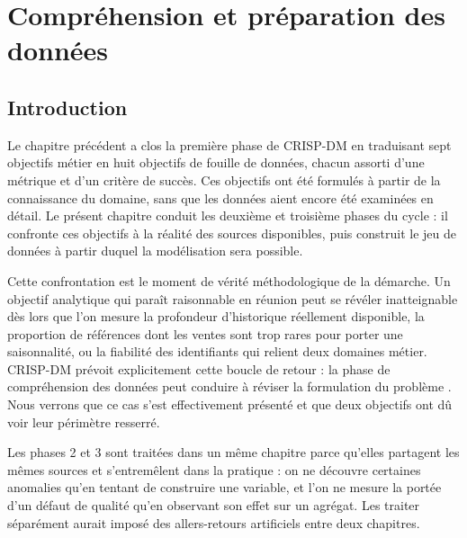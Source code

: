 %

\chapter{Compréhension et préparation des données}
\label{chap:donnees}

\section*{Introduction}

Le chapitre précédent a clos la première phase de CRISP-DM en traduisant sept objectifs métier en huit objectifs de fouille de données, chacun assorti d'une métrique et d'un critère de succès. Ces objectifs ont été formulés à partir de la connaissance du domaine, sans que les données aient encore été examinées en détail. Le présent chapitre conduit les deuxième et troisième phases du cycle : il confronte ces objectifs à la réalité des sources disponibles, puis construit le jeu de données à partir duquel la modélisation sera possible.

Cette confrontation est le moment de vérité méthodologique de la démarche. Un objectif analytique qui paraît raisonnable en réunion peut se révéler inatteignable dès lors que l'on mesure la profondeur d'historique réellement disponible, la proportion de références dont les ventes sont trop rares pour porter une saisonnalité, ou la fiabilité des identifiants qui relient deux domaines métier. CRISP-DM prévoit explicitement cette boucle de retour : la phase de compréhension des données peut conduire à réviser la formulation du problème \cite{chapman2000crisp}. Nous verrons que ce cas s'est effectivement présenté et que deux objectifs ont dû voir leur périmètre resserré.

Les phases 2 et 3 sont traitées dans un même chapitre parce qu'elles partagent les mêmes sources et s'entremêlent dans la pratique : on ne découvre certaines anomalies qu'en tentant de construire une variable, et l'on ne mesure la portée d'un défaut de qualité qu'en observant son effet sur un agrégat. Les traiter séparément aurait imposé des allers-retours artificiels entre deux chapitres.

